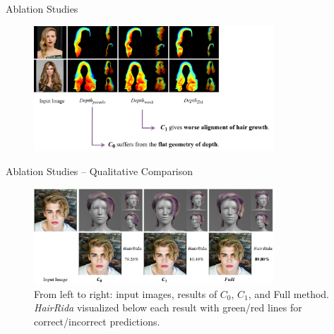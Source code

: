 \begin{frame}[t]{Ablation Studies}
    \begin{figure}
        \centering
        \includegraphics[width=0.8\textwidth]{assets/figures/eval/ablation/depth-comparison.png}
    \end{figure}
\end{frame}

\begin{frame}[t]{Ablation Studies -- Qualitative Comparison}
    \begin{figure}
        \centering
        \includegraphics[width=0.8\textwidth]{assets/figures/eval/ablation/sample-1.png}
        \caption{From left to right: input images, results of $C_0$, $C_1$, and Full method. \textit{HairRida} visualized below each result with green/red lines for correct/incorrect predictions.}
    \end{figure}
\end{frame}
